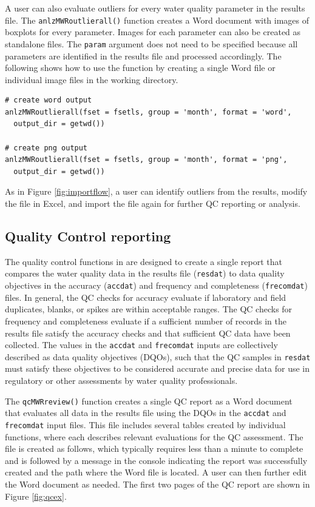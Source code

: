A user can also evaluate outliers for every water quality parameter in the results file. The \texttt{anlzMWRoutlierall()} function creates a Word document with images of boxplots for every parameter. Images for each parameter can also be created as standalone files. The \texttt{param} argument does not need to be specified because all parameters are identified in the results file and processed accordingly. The following shows how to use the function by creating a single Word file or individual image files in the working directory.

\begin{verbatim}
# create word output
anlzMWRoutlierall(fset = fsetls, group = 'month', format = 'word', 
  output_dir = getwd())

# create png output
anlzMWRoutlierall(fset = fsetls, group = 'month', format = 'png', 
  output_dir = getwd())
\end{verbatim}

As in Figure \ref{fig:importflow}, a user can identify outliers from the results, modify the file in Excel, and import the file again for further QC reporting or analysis.

\hypertarget{quality-control-reporting}{%
\subsection{Quality Control reporting}\label{quality-control-reporting}}

The quality control functions in  are designed to create a single report that compares the water quality data in the results file (\texttt{resdat}) to data quality objectives in the accuracy (\texttt{accdat}) and frequency and completeness (\texttt{frecomdat}) files. In general, the QC checks for accuracy evaluate if laboratory and field duplicates, blanks, or spikes are within acceptable ranges. The QC checks for frequency and completeness evaluate if a sufficient number of records in the results file satisfy the accuracy checks and that sufficient QC data have been collected. The values in the \texttt{accdat} and \texttt{frecomdat} inputs are collectively described as data quality objectives (DQOs), such that the QC samples in \texttt{resdat} must satisfy these objectives to be considered accurate and precise data for use in regulatory or other assessments by water quality professionals.

The \texttt{qcMWRreview()} function creates a single QC report as a Word document that evaluates all data in the results file using the DQOs in the \texttt{accdat} and \texttt{frecomdat} input files. This file includes several tables created by individual  functions, where each describes relevant evaluations for the QC assessment. The file is created as follows, which typically requires less than a minute to complete and is followed by a message in the console indicating the report was successfully created and the path where the Word file is located. A user can then further edit the Word document as needed. The first two pages of the QC report are shown in Figure \ref{fig:qcex}.

